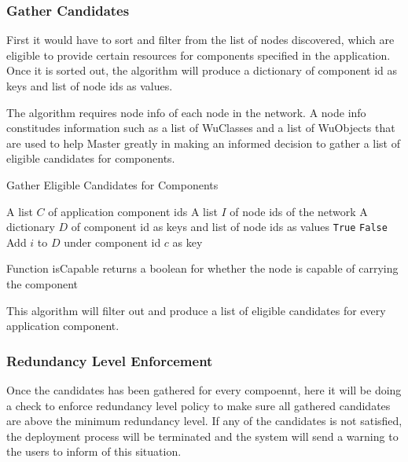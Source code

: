 \subsubsection{Gather Candidates}

First it would have to sort and filter from the list of nodes discovered, which
are eligible to provide certain resources for components specified in the
application. Once it is sorted out, the algorithm will produce a dictionary of
component id as keys and list of node ids as values.

The algorithm requires node info of each node in the network. A node info
constitudes information such as a list of WuClasses and a list of WuObjects
that are used to help Master greatly in making an informed decision to gather
a list of eligible candidates for components.

\begin{algorithm}
\caption{Gather Eligible Candidates for Components}
\label{alg:recovery-chain}
\begin{algorithmic}
\Require A list $C$ of application component ids
\Require A list $I$ of node ids of the network
\Ensure A dictionary $D$ of component id as keys and list of node ids as values
    \State \Return \texttt{True}
  \Else
    \State \Return \texttt{False}
  \EndIf
\EndFunction
{}
      \State Add $i$ to $D$ under component id $c$ as key
    \EndIf
  \EndFor
\EndFor
\end{algorithmic}
\end{algorithm}

Function isCapable returns a boolean for whether the node is capable of
carrying the component

This algorithm will filter out and produce a list of eligible candidates for
every application component.

\subsubsection{Redundancy Level Enforcement}

Once the candidates has been gathered for every compoennt, here it will be
doing a check to enforce redundancy level policy to make sure all gathered
candidates are above the minimum redundancy level. If any of the candidates is
not satisfied, the deployment process will be terminated and the system will
send a warning to the users to inform of this situation.

